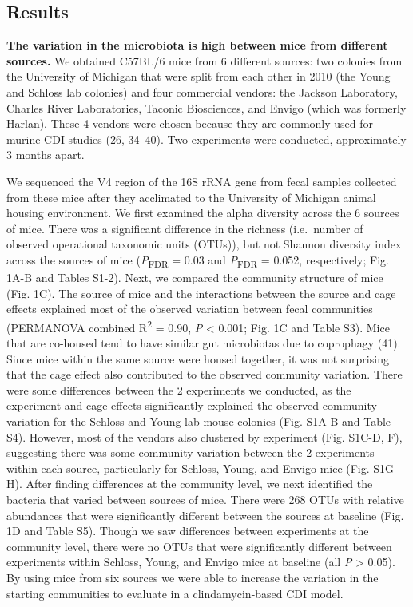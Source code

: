 \documentclass[
  11pt,
]{article}
\begin{document}
\hypertarget{results}{%
\subsection{Results}\label{results}}

\textbf{The variation in the microbiota is high between mice from
different sources.} We obtained C57BL/6 mice from 6 different sources:
two colonies from the University of Michigan that were split from each
other in 2010 (the Young and Schloss lab colonies) and four commercial
vendors: the Jackson Laboratory, Charles River Laboratories, Taconic
Biosciences, and Envigo (which was formerly Harlan). These 4 vendors
were chosen because they are commonly used for murine CDI studies (26,
34--40). Two experiments were conducted, approximately 3 months apart.

We sequenced the V4 region of the 16S rRNA gene from fecal samples
collected from these mice after they acclimated to the University of
Michigan animal housing environment. We first examined the alpha
diversity across the 6 sources of mice. There was a significant
difference in the richness (i.e.~number of observed operational
taxonomic units (OTUs)), but not Shannon diversity index across the
sources of mice (\emph{P}\textsubscript{FDR} = 0.03 and
\emph{P}\textsubscript{FDR} = 0.052, respectively; Fig. 1A-B and Tables
S1-2). Next, we compared the community structure of mice (Fig. 1C). The
source of mice and the interactions between the source and cage effects
explained most of the observed variation between fecal communities
(PERMANOVA combined R\textsuperscript{2} = 0.90, \emph{P} \textless{}
0.001; Fig. 1C and Table S3). Mice that are co-housed tend to have
similar gut microbiotas due to coprophagy (41). Since mice within the
same source were housed together, it was not surprising that the cage
effect also contributed to the observed community variation. There were
some differences between the 2 experiments we conducted, as the
experiment and cage effects significantly explained the observed
community variation for the Schloss and Young lab mouse colonies (Fig.
S1A-B and Table S4). However, most of the vendors also clustered by
experiment (Fig. S1C-D, F), suggesting there was some community
variation between the 2 experiments within each source, particularly for
Schloss, Young, and Envigo mice (Fig. S1G-H). After finding differences
at the community level, we next identified the bacteria that varied
between sources of mice. There were 268 OTUs with relative abundances
that were significantly different between the sources at baseline (Fig.
1D and Table S5). Though we saw differences between experiments at the
community level, there were no OTUs that were significantly different
between experiments within Schloss, Young, and Envigo mice at baseline
(all \emph{P} \textgreater{} 0.05). By using mice from six sources we
were able to increase the variation in the starting communities to
evaluate in a clindamycin-based CDI model.
\end{document}
